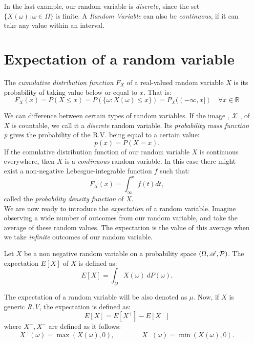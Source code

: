 In the last example, our random variable is \emph{discrete}, since the set $\{X(\omega): \omega \in \Omega\}$ is finite.
 A \emph{Random Variable} can also be \emph{continuous}, if it can take any value within an interval.\\


\section{Expectation of a random variable}

\begin{ndef}
The \emph{cumulative distribution function } $F_X$ of a real-valued random variable $X$ is its probability of taking value below or equal to $x$. That is:
$$
F_X(x) = P(X \leq x) = P(\{\omega : X(\omega) \leq x\}) = P_X((-\infty,x]) \quad \forall x \in \mathbb R
$$
\end{ndef}

We can difference between certain types of random variables. If the image , $\mathcal X$ , of $X$ is countable, we call it a \emph{discrete} random variable. Its \emph{probability mass function p} gives the
probability of the R.V. being equal to a certain value:
$$
p(x) = P(X = x).
$$
If the comulative distribution function of our random variable $X$ is continuous everywhere, then $X$ is a \emph{continuous} random variable.
 In this case there might exist a non-negative Lebesgue-integrable function $f$ such that:
$$
F_X(x) = \int_{\infty}^x f(t) dt,
$$
called the \emph{probability density function} of $X$.\\

We are now ready to introduce the \emph{expectation} of a random variable. Imagine observing a wide number of outcomes from our random variable, and take the average of these random values. The expectation is the value of this average when we 
take \emph{infinite} outcomes of our random variable.

\begin{ndef}\label{def:expectation}
Let $X$ be a non negative random variable on a probability space $(\Omega,\mathscr{A},\mathcal{P})$. The expectation $E[X]$ of $X$ is defined as:
$$
E[X] = \int_\Omega X(\omega) \ dP(\omega).
$$
\end{ndef}
The expectation of a random variable will be also denoted as $\mu$. Now, if $X$ is generic \emph{R.V}, the expectation is defined as:
$$
E[X] = E[X^+] - E[X^-]
$$
where $X^+,X^-$ are defined as it follows:
$$
X^+(\omega) = \max(X(\omega),0), \quad \quad  \quad \quad X^-(\omega) = \min(X(\omega),0).
$$

